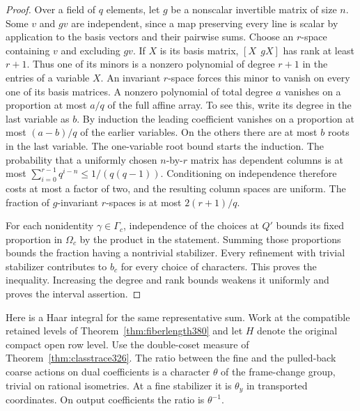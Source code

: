 \documentclass[a4paper,11pt]{article}
\theoremstyle{definition}
\theoremstyle{remark}
\numberwithin{equation}{section}
\begin{document}
\begin{proof}
Over a field of \(q\) elements, let \(g\) be a nonscalar
invertible matrix of size \(n\). Some \(v\) and \(gv\) are
independent, since a map preserving every line is scalar by
application to the basis vectors and their pairwise sums.
Choose an \(r\)-space containing \(v\) and excluding \(gv\).
If \(X\) is its basis matrix, \([X\ \ gX]\) has rank at
least \(r+1\). Thus one of its minors is a nonzero polynomial
of degree \(r+1\) in the entries of a variable \(X\).
An invariant \(r\)-space forces this minor to vanish on every
one of its basis matrices. A nonzero polynomial of total
degree \(a\) vanishes on a proportion at most \(a/q\) of
the full affine array. To see this, write its degree in the
last variable as \(b\). By induction the leading coefficient
vanishes on a proportion at most \((a-b)/q\) of the earlier
variables. On the others there are at most \(b\) roots in the
last variable. The one-variable root bound starts the induction.
The probability that a uniformly chosen \(n\)-by-\(r\)
matrix has dependent columns is at most
\(\sum_{i=0}^{r-1}q^{i-n}\le1/(q(q-1))\). Conditioning on
independence therefore costs at most a factor of two, and the
resulting column spaces are uniform. The fraction of
\(g\)-invariant \(r\)-spaces is at most \(2(r+1)/q\).

For each nonidentity \(\gamma\in\Gamma_c\), independence of
the choices at \(Q'\) bounds its fixed proportion in
\(\Omega_c\) by the product in the statement. Summing those
proportions bounds the fraction having a nontrivial stabilizer.
Every refinement with trivial stabilizer contributes to \(b_c\)
for every choice of characters. This proves the inequality.
Increasing the degree and rank bounds weakens it uniformly
and proves the interval assertion.
\end{proof}

Here is a Haar integral for the same representative sum. Work at
the compatible retained levels of Theorem~\ref{thm:fiberlength380}
and let \(H\) denote the original compact open row level. Use the
double-coset measure of Theorem~\ref{thm:classtrace326}. The
ratio between the fine and the pulled-back coarse actions on
dual coefficients is a character \(\theta\) of the frame-change
group, trivial on rational isometries. At a fine stabilizer it
is \(\theta_y\) in transported coordinates. On output
coefficients the ratio is \(\theta^{-1}\).
\end{document}
